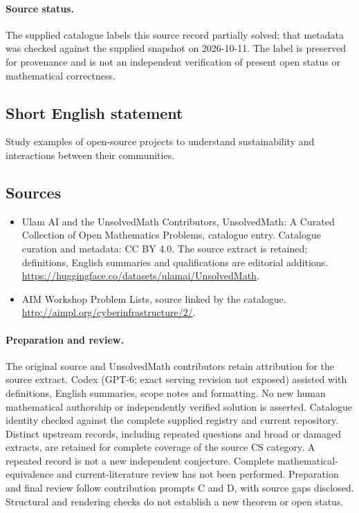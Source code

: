 \documentclass[11pt]{article}
\begin{document}
\paragraph{Source status.}
The supplied catalogue labels this source record partially solved; that metadata was checked against the supplied snapshot on 2026-10-11. The label is preserved for provenance and is not an independent verification of present open status or mathematical correctness.
\subsection{Short English statement}
Study examples of open-source projects to understand sustainability and interactions between their communities.
\subsection{Sources}
\begin{itemize}
\item[\hypertarget{source:statement:1}{S1}] Ulam AI and the UnsolvedMath Contributors, UnsolvedMath: A Curated Collection of Open Mathematics Problems, catalogue entry. Catalogue curation and metadata: CC BY 4.0. The source extract is retained; definitions, English summaries and qualifications are editorial additions.
\url{https://huggingface.co/datasets/ulamai/UnsolvedMath}.
\item[\hypertarget{source:statement:2}{S2}] AIM Workshop Problem Lists, source linked by the catalogue.
\url{http://aimpl.org/cyberinfrastructure/2/}.
\end{itemize}
\paragraph{Preparation and review.}
The original source and UnsolvedMath contributors retain attribution for the source extract. Codex (GPT-6; exact serving revision not exposed) assisted with definitions, English summaries, scope notes and formatting. No new human mathematical authorship or independently verified solution is asserted. Catalogue identity checked against the complete supplied registry and current repository. Distinct upstream records, including repeated questions and broad or damaged extracts, are retained for complete coverage of the source CS category. A repeated record is not a new independent conjecture. Complete mathematical-equivalence and current-literature review has not been performed. Preparation and final review follow contribution prompts C and D, with source gaps disclosed. Structural and rendering checks do not establish a new theorem or open status.
\label{end:statement}
\end{document}
